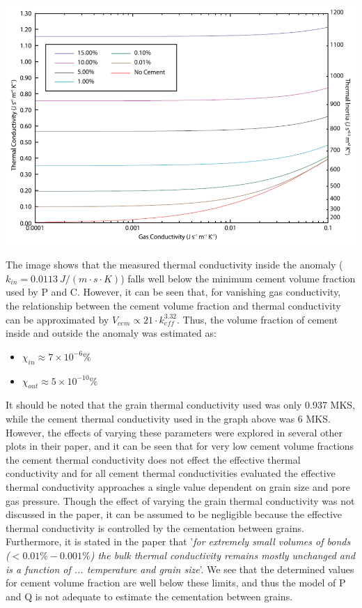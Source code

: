 \documentclass[11pt]{article} %
\begin{document}
	 \includegraphics[scale=0.5]{PandQ2009b_CementVolumeFraction.png}

	The image shows that the measured thermal conductivity inside the anomaly ($k_{in} = 0.0113 \: J/(m \cdot s \cdot K)$) falls well below the minimum cement volume fraction used by P and C. However, it can be seen that, for vanishing gas conductivity,  the relationship between the cement volume fraction and thermal conductivity can be approximated by $V_{cem} \varpropto 21\cdot k_{eff}^{3.32}$. Thus, the volume fraction of cement inside and outside the anomaly was estimated as:
	
	\begin{itemize}
	\item $\chi_{in} \approx 7\times10^{-6}\%$
	\item $\chi_{out} \approx 5\times10^{-10}\%$
	\end{itemize}
	
	It should be noted that the grain thermal conductivity used was only 0.937 MKS, while the cement thermal conductivity used in the graph above was 6 MKS. However, the effects of varying these parameters were explored in several other plots in their paper, and it can be seen that for very low cement volume fractions the cement thermal conductivity does not effect the effective thermal conductivity and for all cement thermal conductivities evaluated the effective thermal conductivity approaches a single value dependent on grain size and pore gas pressure. Though the effect of varying the grain thermal conductivity was not discussed in the paper, it can be assumed to be negligible because the effective thermal conductivity is controlled by the cementation between grains. Furthermore, it is stated in the paper that '\emph{for extremely small volumes of bonds ($< 0.01\%-0.001\%$) the bulk thermal conductivity remains mostly unchanged and is a function of ... temperature and grain size}'. We see that the determined values for cement volume fraction are well below these limits, and thus the model of P and Q is not adequate to estimate the cementation between grains. 
	
\end{document}
